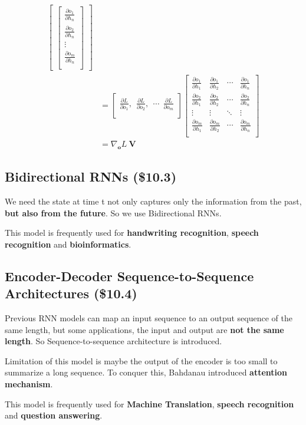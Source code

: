 \documentclass[12pt]{article}
\numberwithin{equation}{section}
\begin{document}
\begin{equation}
\begin{split}
\begin{bmatrix}
\begin{bmatrix}
	\frac{\partial o_1}{\partial h_n}\\
	\frac{\partial o_2}{\partial h_n}\\
	\vdots\\
	\frac{\partial o_m}{\partial h_n}\\
	\end{bmatrix}
\end{bmatrix} \\&= 
\begin{bmatrix}
\frac{\partial L}{\partial o_1},
\ \ \frac{\partial L}{\partial o_2},
\ \ \cdots
\ \ \frac{\partial L}{\partial o_m}\\
\end{bmatrix}
\begin{bmatrix}
\frac{\partial o_{1}}{\partial h_1} & \frac{\partial o_{1}}{\partial h_2} & \cdots & \frac{\partial o_{1}}{\partial h_n}\\
\frac{\partial o_{2}}{\partial h_1} & \frac{\partial o_{2}}{\partial h_2} & \cdots & \frac{\partial o_{2}}{\partial h_n}\\
\vdots & \vdots & \ddots & \vdots\\
\frac{\partial o_{m}}{\partial h_1} & \frac{\partial o_{m}}{\partial h_2} & \cdots & \frac{\partial o_{m}}{\partial h_n}\\
\end{bmatrix} \\&= 
\nabla_{\mathbf{o}} L \ \mathbf{V}
\end{split}\end{equation}
\subsection{Bidirectional RNNs (\$10.3)}
	We need the state at time t not only captures only the information from the past, \textbf{but also from the future}. So we use Bidirectional RNNs. \par
	This model is frequently used for \textbf{handwriting recognition}, \textbf{speech recognition} and \textbf{bioinformatics}.
\subsection{Encoder-Decoder Sequence-to-Sequence Architectures (\$10.4)}
	Previous RNN models can map an input sequence to an output sequence of the same length, but some applications, the input and output are \textbf{not the same length}. So Sequence-to-sequence architecture is introduced. \par
	Limitation of this model is maybe the output of the encoder is too small to summarize a long sequence. To conquer this, Bahdanau\citep{bahdanau2014neural} introduced \textbf{attention mechanism}. \par
	This model is frequently used for \textbf{Machine Translation}, \textbf{speech recognition} and \textbf{question answering}.
\end{document}
